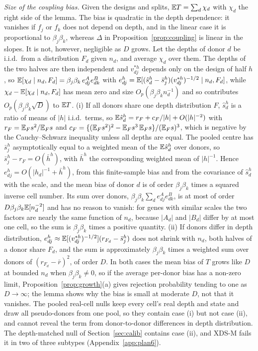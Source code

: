 \emph{Size of the coupling bias.} Given the designs and splits, $\mathbb{E} T=\sum_d\chi_d$ with $\chi_d$ the right side of the lemma. The bias is quadratic in the depth dependence: it vanishes if $f_j$ or $f_k$ does not depend on depth, and in the linear case it is proportional to $\beta_j\beta_k$, whereas $\Delta$ in Proposition~\ref{prop:coupling} is linear in the slopes. It is not, however, negligible as $D$ grows. Let the depths of donor $d$ be i.i.d.\ from a distribution $F_d$ given $n_d$, and average $\chi_d$ over them. The depths of the two halves are then independent and $v^{*h}_{dj}$ depends only on the design of half $h$, so $\mathbb{E}[\chi_d\mid n_d,F_d]=\beta_j\beta_k\,e^A_{dj}e^B_{dk}$ with $e^h_{dj}=\mathbb{E}[(\hat s^h_d-\bar s^h_j)(v^{*h}_{dj})^{-1/2}\mid n_d,F_d]$, while $\chi_d-\mathbb{E}[\chi_d\mid n_d,F_d]$ has mean zero and size $O_p(\beta_j\beta_kn_d^{-1})$ and so contributes $O_p(\beta_j\beta_k\sqrt D)$ to $\mathbb{E} T$. (i) If all donors share one depth distribution $F$, $\hat s^h_d$ is a ratio of means of $|h|$ i.i.d.\ terms, so $\mathbb{E}\hat s^h_d=r_F+c_F/|h|+O(|h|^{-2})$ with $r_F=\mathbb{E}_Fs^2/\mathbb{E}_Fs$ and $c_F=\{(\mathbb{E}_Fs^2)^2-\mathbb{E}_Fs^3\,\mathbb{E}_Fs\}/(\mathbb{E}_Fs)^3$, which is negative by the Cauchy--Schwarz inequality unless all depths are equal. The pooled centre has $\bar s^h_j$ asymptotically equal to a weighted mean of the $\mathbb{E}\hat s^h_d$ over donors, so $\bar s^h_j-r_F=O(\bar h^h)$, with $\bar h^h$ the corresponding weighted mean of $|h|^{-1}$. Hence $e^h_{dj}=O(|h_d|^{-1}+\bar h^h)$, from this finite-sample bias and from the covariance of $\hat s^h_d$ with the scale, and the mean bias of donor $d$ is of order $\beta_j\beta_k$ times a squared inverse cell number. Its sum over donors, $\beta_j\beta_k\sum_de^A_{dj}e^B_{dk}$, is at most of order $D\beta_j\beta_k\mathbb{E}[n_d^{-2}]$ and has no reason to vanish: for genes with similar scales the two factors are nearly the same function of $n_d$, because $|A_d|$ and $|B_d|$ differ by at most one cell, so the sum is $\beta_j\beta_k$ times a positive quantity. (ii) If donors differ in depth distribution, $e^h_{dj}\approx\mathbb{E}[(v^{*h}_{dj})^{-1/2}](r_{F_d}-\bar s^h_j)$ does not shrink with $n_d$, both halves of a donor share $F_d$, and the sum is approximately $\beta_j\beta_k$ times a weighted sum over donors of $(r_{F_d}-\bar r)^2$, of order $D$. In both cases the mean bias of $T$ grows like $D$ at bounded $n_d$ when $\beta_j\beta_k\neq0$, so if the average per-donor bias has a non-zero limit, Proposition~\ref{prop:growth}(a) gives rejection probability tending to one as $D\to\infty$; the lemma shows why the bias is small at moderate $D$, not that it vanishes. The pooled real-cell nulls keep every cell's real depth and state and draw all pseudo-donors from one pool, so they contain case (i) but not case (ii), and cannot reveal the term from donor-to-donor differences in depth distribution. The depth-matched null of Section~\ref{sec:calib} contains case (ii), and XDS-M fails it in two of three subtypes (Appendix~\ref{app:plan6}).


